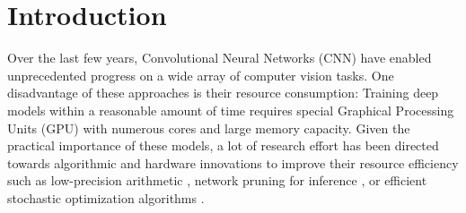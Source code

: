 \documentclass[twocolumn]{bmcart}
\begin{document}
\begin{frontmatter}
\begin{fmbox}
\begin{abstractbox}

\begin{keyword}
\end{keyword}


\end{abstractbox}
\end{fmbox}%
\end{frontmatter}




\section{Introduction}
Over the last few years, Convolutional Neural Networks (CNN) have enabled unprecedented progress on a wide array of computer vision tasks.
One disadvantage of these approaches is their resource consumption: 
Training deep models within a reasonable amount of time requires special
Graphical Processing Units (GPU) with numerous cores and large memory capacity.
Given the practical importance of these models, a lot of research effort has been directed
towards algorithmic and hardware innovations to improve their resource efficiency such as low-precision arithmetic \cite{jacob2018quantization}, network pruning for inference \cite{molchanov2016pruning}, or efficient stochastic optimization algorithms \cite{kingma2014adam}.
\end{document}
